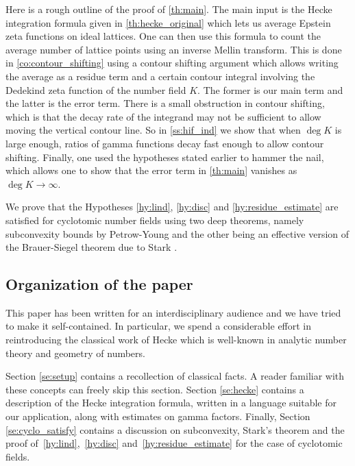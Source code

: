 \documentclass[a4paper]{article}
\theoremstyle{definition}
\theoremstyle{remark}
\begin{document}
Here is a rough outline of the proof of \cref{th:main}. The main input is the Hecke integration formula given in \cref{th:hecke_original} which lets us average Epstein zeta functions on ideal lattices. One can then use this formula to count the average number of lattice points using an inverse Mellin transform. 
This is done in \cref{co:contour_shifting} using a contour shifting argument which allows writing the average as a residue term and a certain contour integral involving the Dedekind zeta function of the number field $K$. The former is our main term and the latter is the error term. 
There is a small obstruction in contour shifting, which is that the decay rate of the integrand may not be sufficient to allow moving the vertical contour line. 
So in \cref{ss:hif_ind} we show that when $\deg K$ is large enough, ratios of gamma functions decay fast enough to allow contour shifting. 
Finally, one used the hypotheses stated earlier to hammer the nail,
which allows
one to show that the error term in \cref{th:main} vanishes as $\deg K \rightarrow \infty$.

We prove that the Hypotheses \ref{hy:lind}, \ref{hy:disc} and \ref{hy:residue_estimate} 
are satisfied for cyclotomic number fields using two deep theorems, 
namely subconvexity bounds by Petrow-Young \cite{PY23} and the other being an effective version of the Brauer-Siegel theorem due to Stark \cite{S1974}. 


\subsection*{Organization of the paper}



This paper has been written for an interdisciplinary audience and we have tried to make it self-contained. In particular, we spend a considerable effort in reintroducing the classical work of Hecke which is well-known in analytic number theory and geometry of numbers.

Section \ref{se:setup} contains a recollection of classical facts. 
A reader familiar with these concepts can freely skip this section.
Section \ref{se:hecke} contains a description of the Hecke integration formula, written in a language suitable for our application, along with estimates on gamma factors. 
Finally, Section \ref{se:cyclo_satisfy} contains a discussion on subconvexity, Stark's theorem and the proof of~\cref{hy:lind},~\cref{hy:disc} and~\cref{hy:residue_estimate} for the case of cyclotomic fields.
\end{document}
